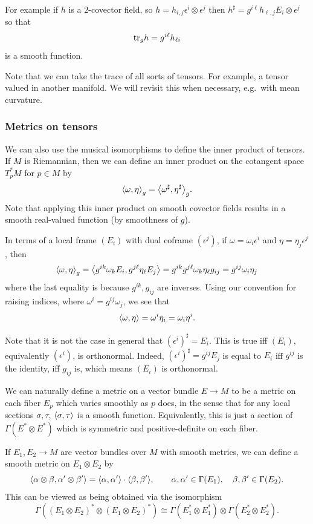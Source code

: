 For example if $h$ is a $2$-covector field, so $h=h_{i,j}\epsilon^i\otimes\epsilon^j$ then $h^\sharp=g^{i\ell}h_{\ell,j}E_i\otimes\epsilon^j$ so that
$$ {\rm tr}_gh = g^{i\ell}h_{\ell i} $$
is a smooth function.

Note that we can take the trace of all sorts of tensors.
For example, a tensor valued in another manifold.
We will revisit this when necessary, e.g.\ with mean curvature.

\subsubsection*{Metrics on tensors}

We can also use the musical isomorphisms to define the inner product of tensors.
If $M$ is Riemannian, then we can define an inner product on the cotangent space $T_p^*M$ for $p\in M$ by
$$ \mathopen{}\mathclose{\left<\omega,\eta\right>}_g = \mathopen{}\mathclose{\left<\omega^\sharp,\eta^\sharp\right>}_g . $$
Note that applying this inner product on smooth covector fields results in a smooth real-valued function (by smoothness of $g$).

In terms of a local frame $(E_i)$ with dual coframe $(\epsilon^j)$, if $\omega=\omega_i\epsilon^i$ and $\eta=\eta_j\epsilon^j$, then
$$ \mathopen{}\mathclose{\left<\omega,\eta\right>}_g = \mathopen{}\mathclose{\left<g^{ik}\omega_k E_i,g^{j\ell}\eta_\ell E_j\right>} = g^{ik}g^{j\ell}\omega_k\eta_\ell g_{ij} = g^{ij}\omega_i\eta_j $$
where the last equality is because $g^{ik},g_{ij}$ are inverses.
Using our convention for raising indices, where $\omega^i=g^{ij}\omega_j$, we see that
$$ \mathopen{}\mathclose{\left<\omega,\eta\right>} = \omega^i\eta_i = \omega_i\eta^i . $$

Note that it is not the case in general that $(\epsilon^i)^\sharp=E_i$.
This is true iff $(E_i)$, equivalently $(\epsilon^i)$, is orthonormal.
Indeed, $(\epsilon^i)^\sharp=g^{ij}E_j$ is equal to $E_i$ iff $g^{ij}$ is the identity, iff $g_{ij}$ is, which means $(E_i)$ is orthonormal.

We can naturally define a metric on a vector bundle $E\to M$ to be a metric on each fiber $E_p$ which varies smoothly as $p$ does, in the sense that for any local
sections $\sigma,\tau$, $\mathopen{}\mathclose{\left<\sigma,\tau\right>}$ is a smooth function.
Equivalently, this is just a section of $\Gamma(E^*\otimes E^*)$ which is symmetric and positive-definite on each fiber.

If $E_1,E_2\to M$ are vector bundles over $M$ with smooth metrics, we can define a smooth metric on $E_1\otimes E_2$ by
$$ \mathopen{}\mathclose{\left<\alpha\otimes\beta,\alpha'\otimes\beta'\right>} = \mathopen{}\mathclose{\left<\alpha,\alpha'\right>}\cdot\mathopen{}\mathclose{\left<\beta,\beta'\right>},\qquad \alpha,\alpha'\in\Gamma(E_1),\quad \beta,\beta'\in\Gamma(E_2) . $$
This can be viewed as being obtained via the isomorphism
$$ \Gamma((E_1\otimes E_2)^*\otimes(E_1\otimes E_2)^*) \cong \Gamma(E_1^*\otimes E_1^*)\otimes\Gamma(E_2^*\otimes E_2^*) . $$


